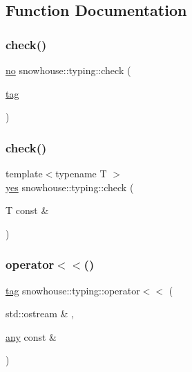 \subsection{Function Documentation}
\mbox{\label{namespacesnowhouse_1_1typing_a8d1fa0dba5f3c09df59b67e070ef6deb}} 
\subsubsection{\texorpdfstring{check()}{check()}\hspace{0.1cm}{\footnotesize\ttfamily [1/2]}}
{\footnotesize\ttfamily \mbox{\hyperlink{namespacesnowhouse_1_1typing_ad9bd8c4cca2c9f7de1faf7a7f53b1bda}{no}} snowhouse\+::typing\+::check (\begin{DoxyParamCaption}\item[{\mbox{\hyperlink{structsnowhouse_1_1typing_1_1tag}{tag}}}]{ }\end{DoxyParamCaption})}

\mbox{\label{namespacesnowhouse_1_1typing_a5587ff1cbc586105dd1feed91a6b5b4e}} 
\subsubsection{\texorpdfstring{check()}{check()}\hspace{0.1cm}{\footnotesize\ttfamily [2/2]}}
{\footnotesize\ttfamily template$<$typename T $>$ \\
\mbox{\hyperlink{namespacesnowhouse_1_1typing_a4b319cb7567ee3475023c05ed2dadb16}{yes}} snowhouse\+::typing\+::check (\begin{DoxyParamCaption}\item[{T const \&}]{ }\end{DoxyParamCaption})}

\mbox{\label{namespacesnowhouse_1_1typing_aec82124576c20b7d8158d2255d495c6a}} 
\subsubsection{\texorpdfstring{operator$<$$<$()}{operator<<()}}
{\footnotesize\ttfamily \mbox{\hyperlink{structsnowhouse_1_1typing_1_1tag}{tag}} snowhouse\+::typing\+::operator$<$$<$ (\begin{DoxyParamCaption}\item[{std\+::ostream \&}]{,  }\item[{\mbox{\hyperlink{structsnowhouse_1_1typing_1_1any}{any}} const \&}]{ }\end{DoxyParamCaption})}

